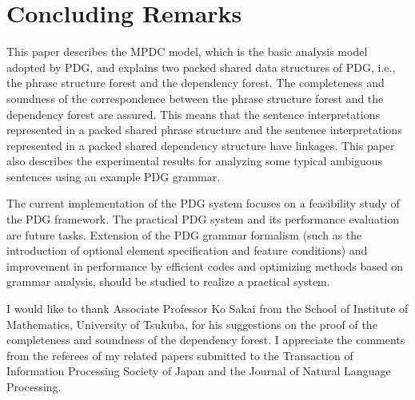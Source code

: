 \documentclass[english]{jnlp_1.4_rep}
\theoremstyle{break}
\theoremstyle{plain}
\theoremstyle{plain}
\begin{document}
\section{Concluding Remarks}

This paper describes the MPDC model, which is the basic analysis model
adopted by PDG, and explains two packed shared data structures of PDG,
i.e., the phrase structure forest and the dependency forest. The
completeness and soundness of the correspondence between the phrase
structure forest and the dependency forest are assured. This means
that the sentence interpretations represented in a packed shared phrase
structure and the sentence interpretations represented in a packed
shared dependency structure have linkages. This paper also describes
the experimental results for analyzing some typical ambiguous
sentences using an example PDG grammar.

The current implementation of the PDG system focuses on a feasibility
study of the PDG framework. The practical PDG system and its
performance evaluation are future tasks. Extension of the PDG grammar
formalism (such as the introduction of optional element specification
and feature conditions) and improvement in performance by efficient
codes and optimizing methods based on grammar analysis, should be
studied to realize a practical system.

\acknowledgment

I would like to thank Associate Professor Ko Sakai from the School of
Institute of Mathematics, University of Tsukuba, for his suggestions
on the proof of the completeness and soundness of the dependency
forest. I appreciate the comments from the referees of my related
papers submitted to the Transaction of Information Processing Society
of Japan and the Journal of Natural Language Processing.
\end{document}
